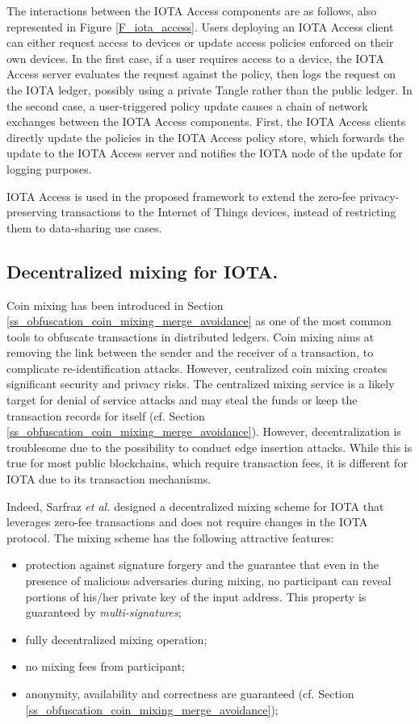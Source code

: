  The interactions between the IOTA Access components are as follows, also represented in Figure \ref{F_iota_access}. Users deploying an IOTA Access client can either request access to devices or update access policies enforced on their own devices.
 In the first case, if a user requires access to a device, the IOTA Access server evaluates the request against the policy, then logs the 
 request on the IOTA ledger, possibly using a private Tangle rather than the public ledger. In the second case, a user-triggered policy update causes a chain of network exchanges between the IOTA Access components.
First, the IOTA Access clients directly update the policies in the IOTA Access policy store, which forwards the update to the IOTA Access server and notifies the IOTA node of the update for logging purposes. 

IOTA Access is used in the proposed framework to extend the zero-fee privacy-preserving transactions to the Internet of Things devices, 
instead of restricting them to data-sharing use cases.
 \subsection{Decentralized mixing for IOTA.}
 \label{ss_decentralized_mixing_iota}
Coin mixing has been introduced in Section \ref{ss_obfuscation_coin_mixing_merge_avoidance} as one of the most common tools to obfuscate transactions 
in distributed ledgers. Coin mixing aims at removing the link between the sender and the receiver of a transaction, to complicate re-identification attacks.
However, centralized coin mixing creates significant security and privacy risks. The centralized mixing service is a likely target for denial of service 
attacks and may steal the funds or keep the transaction records for itself (cf. Section \ref{ss_obfuscation_coin_mixing_merge_avoidance}). 
However, decentralization is troublesome due to the possibility to conduct edge insertion attacks. While this is true for most public blockchains, which require transaction fees, it is 
different for IOTA due to its transaction mechanisms.

Indeed, Sarfraz \emph{et al.} \cite{Sarfraz2019} designed a decentralized mixing scheme for IOTA that leverages zero-fee transactions 
and does not require changes in the IOTA protocol. The mixing scheme has the following attractive features:
\begin{itemize}
  \item protection against signature forgery and the guarantee that
  even in the presence of malicious adversaries during mixing,
  no participant can reveal portions of his/her private key of the
  input address. This property is guaranteed by \emph{multi-signatures};
  \item fully decentralized mixing operation;
  \item no mixing fees from participant;
  \item anonymity, availability and correctness are guaranteed (cf. Section \ref{ss_obfuscation_coin_mixing_merge_avoidance});
\end{itemize}

